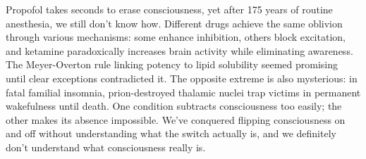 Propofol takes seconds to erase consciousness, yet after 175 years of routine anesthesia, we still don't know how. Different drugs achieve the same oblivion through various mechanisms: some enhance inhibition, others block excitation, and ketamine paradoxically increases brain activity while eliminating awareness. The Meyer-Overton rule linking potency to lipid solubility seemed promising until clear exceptions contradicted it. The opposite extreme is also mysterious: in fatal familial insomnia, prion-destroyed thalamic nuclei trap victims in permanent wakefulness until death. One condition subtracts consciousness too easily; the other makes its absence impossible. We've conquered flipping consciousness on and off without understanding what the switch actually is, and we definitely don't understand what consciousness really is.